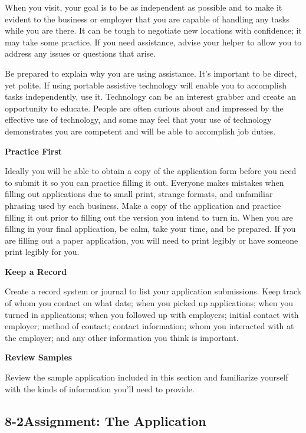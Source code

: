 When you visit, your goal is to be as independent as possible and to make it evident to the business or employer that you are capable of handling any tasks while you are there. It can be tough to negotiate new locations with confidence; it may take some practice. If you need assistance, advise your helper to allow you to address any issues or questions that arise.

Be prepared to explain why you are using assistance. It's important to be direct, yet polite. If using portable assistive technology will enable you to accomplish tasks independently, use it. Technology can be an interest grabber and create an opportunity to educate. People are often curious about and impressed by the effective use of technology, and some may feel that your use of technology demonstrates you are competent and will be able to accomplish job duties.

\textbf{Practice First}

Ideally you will be able to obtain a copy of the application form before you need to submit it so you can practice filling it out. Everyone makes mistakes when filling out applications due to small print, strange formats, and unfamiliar phrasing used by each business. Make a copy of the application and practice filling it out prior to filling out the version you intend to turn in. When you are filling in your final application, be calm, take your time, and be prepared. If you are filling out a paper application, you will need to print legibly or have someone print legibly for you.
 
\textbf{Keep a Record}

Create a record system or journal to list your application submissions. Keep track of whom you contact on what date; when you picked up applications; when you turned in applications; when you followed up with employers; initial contact with employer; method of contact; contact information; whom you interacted with at the employer; and any other information you think is important.

\textbf{Review Samples}

Review the sample application included in this section and familiarize yourself with the kinds of information you'll need to provide.
\pagebreak \subsection*{8-2\quad Assignment: The Application}
